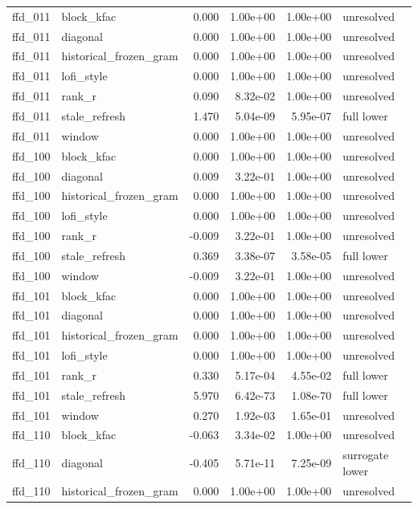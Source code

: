 \begin{table}[p]
\begin{tabular}{llrrrl}
ffd\_011 & block\_kfac & 0.000 & 1.00e+00 & 1.00e+00 & unresolved \\
ffd\_011 & diagonal & 0.000 & 1.00e+00 & 1.00e+00 & unresolved \\
ffd\_011 & historical\_frozen\_gram & 0.000 & 1.00e+00 & 1.00e+00 & unresolved \\
ffd\_011 & lofi\_style & 0.000 & 1.00e+00 & 1.00e+00 & unresolved \\
ffd\_011 & rank\_r & 0.090 & 8.32e-02 & 1.00e+00 & unresolved \\
ffd\_011 & stale\_refresh & 1.470 & 5.04e-09 & 5.95e-07 & full lower \\
ffd\_011 & window & 0.000 & 1.00e+00 & 1.00e+00 & unresolved \\
ffd\_100 & block\_kfac & 0.000 & 1.00e+00 & 1.00e+00 & unresolved \\
ffd\_100 & diagonal & 0.009 & 3.22e-01 & 1.00e+00 & unresolved \\
ffd\_100 & historical\_frozen\_gram & 0.000 & 1.00e+00 & 1.00e+00 & unresolved \\
ffd\_100 & lofi\_style & 0.000 & 1.00e+00 & 1.00e+00 & unresolved \\
ffd\_100 & rank\_r & -0.009 & 3.22e-01 & 1.00e+00 & unresolved \\
ffd\_100 & stale\_refresh & 0.369 & 3.38e-07 & 3.58e-05 & full lower \\
ffd\_100 & window & -0.009 & 3.22e-01 & 1.00e+00 & unresolved \\
ffd\_101 & block\_kfac & 0.000 & 1.00e+00 & 1.00e+00 & unresolved \\
ffd\_101 & diagonal & 0.000 & 1.00e+00 & 1.00e+00 & unresolved \\
ffd\_101 & historical\_frozen\_gram & 0.000 & 1.00e+00 & 1.00e+00 & unresolved \\
ffd\_101 & lofi\_style & 0.000 & 1.00e+00 & 1.00e+00 & unresolved \\
ffd\_101 & rank\_r & 0.330 & 5.17e-04 & 4.55e-02 & full lower \\
ffd\_101 & stale\_refresh & 5.970 & 6.42e-73 & 1.08e-70 & full lower \\
ffd\_101 & window & 0.270 & 1.92e-03 & 1.65e-01 & unresolved \\
ffd\_110 & block\_kfac & -0.063 & 3.34e-02 & 1.00e+00 & unresolved \\
ffd\_110 & diagonal & -0.405 & 5.71e-11 & 7.25e-09 & surrogate lower \\
ffd\_110 & historical\_frozen\_gram & 0.000 & 1.00e+00 & 1.00e+00 & unresolved \\

\end{tabular}
\end{table}
